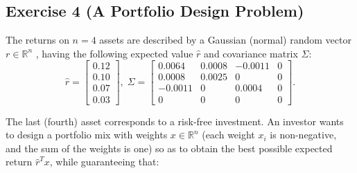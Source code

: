 \documentclass[11pt]{article}
\begin{document}
\newpage
\subsection*{Exercise 4 (A Portfolio Design Problem)}

The returns on $n = 4$ assets are described by a Gaussian (normal) random vector $r \in \mathbb{R}^n$ , having the following expected value $\hat{r}$ and covariance matrix $\Sigma$:
\[
\hat{r} =
\begin{bmatrix}
    0.12  \\
    0.10  \\
    0.07 \\
    0.03

\end{bmatrix}, \; \Sigma =
\begin{bmatrix}
    0.0064 & 0.0008 & -0.0011  & 0 \\
    0.0008 & 0.0025 & 0  & 0 \\
    -0.0011 & 0 & 0.0004  & 0 \\
    0 & 0 & 0  & 0

\end{bmatrix}
.
\]


The last (fourth) asset corresponds to a risk-free investment. An investor
wants to design a portfolio mix with weights $x \in \mathbb{R}^n$ (each weight $x_i$
is non-negative, and the sum of the weights is one) so as to obtain the best possible expected return $\hat{r}^Tx$, while guaranteeing that: \\
\end{document}
